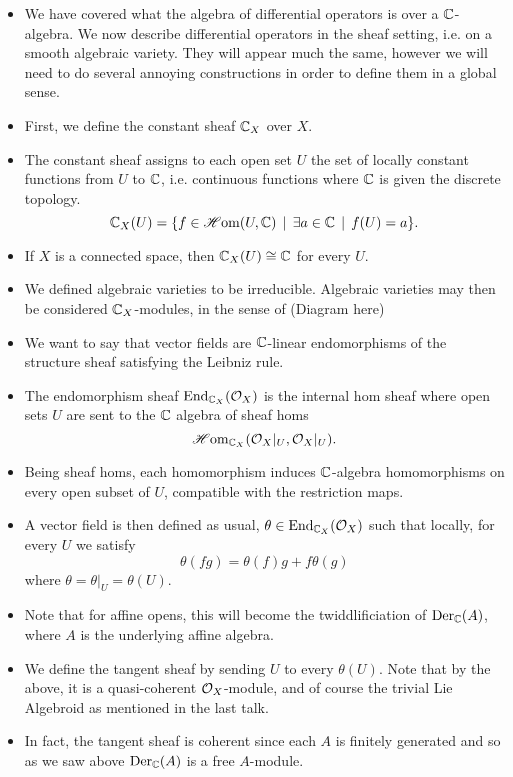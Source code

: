 \documentclass[a4paper]{article}
\begin{document}
\begin{itemize}
    \item We have covered what the algebra of differential operators is over a $\mathbb{C}$-algebra. We now describe differential operators in the sheaf setting, i.e. on a smooth algebraic variety. They will appear much the same, however we will need to do several annoying constructions in order to define them in a global sense.
    \item First, we define the constant sheaf $\mathbb{C}_X$ over $X$.
    \item The constant sheaf assigns to each open set $U$ the set of locally constant functions from $U$ to $\mathbb{C}$, i.e. continuous functions where $\mathbb{C}$ is given the discrete topology.
        \[
            \mathbb{C}_X(U) = \{f \in \operatorname{\mathscr{H}om}(U, \mathbb{C}) \,\mid\, \exists a\in \mathbb{C} \,\mid\, f(U) = a\}.
        \]
    \item If $X$ is a connected space, then $\mathbb{C}_X(U) \cong \mathbb{C}$ for every $U$.
    \item We defined algebraic varieties to be irreducible. Algebraic varieties may then be considered $\mathbb{C}_X$-modules, in the sense of (Diagram here)
    \item We want to say that vector fields are $\mathbb{C}$-linear endomorphisms of the structure sheaf satisfying the Leibniz rule.
    \item The endomorphism sheaf $\operatorname{End}_{\mathbb{C}_X}(\mathcal{O}_X)$ is the internal hom sheaf where open sets $U$ are sent to the $\mathbb{C}$ algebra of sheaf homs
        \[
            \operatorname{\mathscr{H}om}_{\mathbb{C}_X}(\mathcal{O}_X|_U, \mathcal{O}_X|_U).
        \]
    \item Being sheaf homs, each homomorphism induces $\mathbb{C}$-algebra homomorphisms on every open subset of $U$, compatible with the restriction maps.
    \item A vector field is then defined as usual, $\theta \in \operatorname{End}_{\mathbb{C}_X}(\mathcal{O}_X)$ such that locally, for every $U$ we satisfy
        \[
            \theta(fg) = \theta(f)g + f\theta(g)
        \]
        where $\theta = \theta|_U = \theta(U)$.
    \item Note that for affine opens, this will become the twiddlificiation of $\operatorname{Der}_{\mathbb{C}}(A)$, where $A$ is the underlying affine algebra.
    \item We define the tangent sheaf by sending $U$ to every $\theta(U)$. Note that by the above, it is a quasi-coherent $\mathcal{O}_X$-module, and of course the trivial Lie Algebroid as mentioned in the last talk.
    \item In fact, the tangent sheaf is coherent since each $A$ is finitely generated and so as we saw above $\operatorname{Der}_{\mathbb{C}}(A)$ is a free $A$-module.

\end{itemize}
\end{document}
